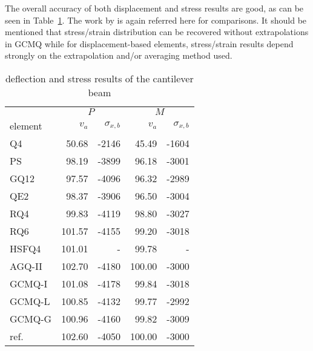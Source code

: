 \documentclass[3p,sort&compress,review,11pt]{elsarticle}
\newcommand*{\tabref}[1]{Table~\ref{#1}}
\begin{document}
The overall accuracy of both displacement and stress results are good, as can be seen in \tabref{table:cantilever_beam}. The work by \citet{Cen2015} is again referred here for comparisons. It should be mentioned that stress/strain distribution can be recovered without extrapolations in GCMQ while for displacement-based elements, stress/strain results depend strongly on the extrapolation and/or averaging method used.
\begin{table}[H]
\centering\scriptsize\caption{deflection and stress results of the cantilever beam}\label{table:cantilever_beam}
\begin{tabular}{lrrrr}
	\toprule
	                        & \multicolumn{2}{c}{$P$} & \multicolumn{2}{c}{$M$} \\
	element                 &  $v_a$ & $\sigma_{x,b}$ &  $v_a$ & $\sigma_{x,b}$ \\ \midrule
	Q4 \citep{Taig1964}     &  50.68 &          -2146 &  45.49 &          -1604 \\
	PS \citep{Pian1985}     &  98.19 &          -3899 &  96.18 &          -3001 \\
	GQ12 \citep{Long1994}   &  97.57 &          -4096 &  96.32 &          -2989 \\
	QE2 \citep{Piltner1995} &  98.37 &          -3906 &  96.50 &          -3004 \\
	RQ4 \citep{Cheung2000}  &  99.83 &          -4119 &  98.80 &          -3027 \\
	RQ6 \citep{Cheung2000}  & 101.57 &          -4155 &  99.20 &          -3018 \\
	HSFQ4 \citep{Cen2011}   & 101.01 &              - &  99.78 &              - \\
	AGQ-II \citep{Chen2004} & 102.70 &          -4180 & 100.00 &          -3000 \\
	GCMQ-I                  & 101.08 &          -4178 &  99.84 &          -3018 \\
	GCMQ-L                  & 100.85 &          -4132 &  99.77 &          -2992 \\
	GCMQ-G                  & 100.96 &          -4160 &  99.82 &          -3009 \\ \midrule
	ref. \citep{Long1994}   & 102.60 &          -4050 & 100.00 &          -3000 \\ \bottomrule
\end{tabular}
\end{table}
\end{document}
